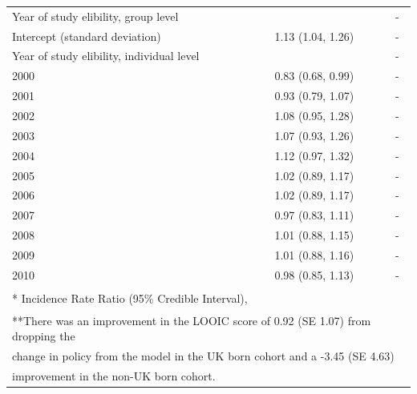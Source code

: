 \documentclass[11pt,twoside]{bristolthesis}
\begin{document}
\begin{table}[!h]
\begin{tabular}{lll}
  Year of study elibility, group level &  & -\\
  \hspace{1em}Intercept (standard deviation) & 1.13 (1.04, 1.26) & -\\
  Year of study elibility, individual level &  & -\\
  \addlinespace
  \hspace{1em}2000 & 0.83 (0.68, 0.99) & -\\
  \hspace{1em}2001 & 0.93 (0.79, 1.07) & -\\
  \hspace{1em}2002 & 1.08 (0.95, 1.28) & -\\
  \hspace{1em}2003 & 1.07 (0.93, 1.26) & -\\
  \hspace{1em}2004 & 1.12 (0.97, 1.32) & -\\
  \addlinespace
  \hspace{1em}2005 & 1.02 (0.89, 1.17) & -\\
  \hspace{1em}2006 & 1.02 (0.89, 1.17) & -\\
  \hspace{1em}2007 & 0.97 (0.83, 1.11) & -\\
  \hspace{1em}2008 & 1.01 (0.88, 1.15) & -\\
  \hspace{1em}2009 & 1.01 (0.88, 1.16) & -\\
  \addlinespace
  \hspace{1em}2010 & 0.98 (0.85, 1.13) & -\\
  \bottomrule
  \multicolumn{3}{l}{\textsuperscript{} * Incidence Rate Ratio (95\% Credible Interval),}\\
  \multicolumn{3}{l}{\textsuperscript{} **There was an improvement in the LOOIC score of 0.92 (SE 1.07) from dropping the}\\
  \multicolumn{3}{l}{change in policy from the model in the UK born cohort and a -3.45 (SE 4.63)}\\
  \multicolumn{3}{l}{improvement in the non-UK born cohort.}\\
  \end{tabular}
  \end{table}
\end{document}
